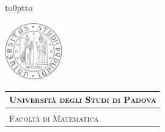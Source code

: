 \documentclass[a4paper, 12pt, twoside, openright]{book}
\begin{document}
\frontmatter
{}

	\hypersetup{linkcolor = black}

\begin{titlepage} %
\begin{center}
\vbox to0pt{\vbox to\vss}

\hspace{0.5cm}
\begin{minipage}{.20\textwidth}
  \includegraphics[height=2.5cm]{images/unipd-bn.png}
\end{minipage}\begin{minipage}{.90\textwidth}
  \begin{table}[H]
  \begin{tabular}{l}
  \scshape{\Large{\bfseries{Università degli Studi di Padova}}} \\
  \hline \\
  \scshape{\Large{Facoltà di Matematica}} \\
  \end{tabular}
  \end{table}
\end{minipage}


\end{center}
\end{titlepage}
\end{document}
